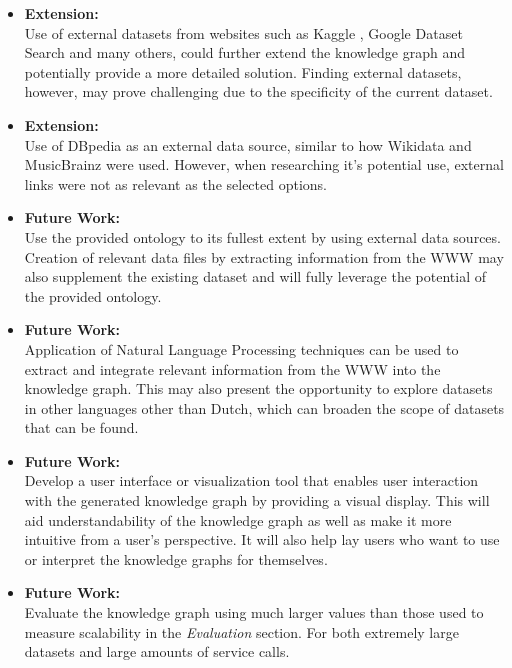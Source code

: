 \begin{itemize}
    \item \textbf{Extension:} \\ Use of external datasets from websites such as Kaggle \cite{kaggle}, Google Dataset Search \cite{googledatasetsearch} and many others, could further extend the knowledge graph and potentially provide a more detailed solution. Finding external datasets, however, may prove challenging due to the specificity of the current dataset.  
    \item \textbf{Extension:} \\ Use of DBpedia \cite{organdbpedia} as an external data source, similar to how Wikidata and MusicBrainz were used. However, when researching it's potential use, external links were not as relevant as the selected options. 
    \item \textbf{Future Work:} \\ Use the provided ontology to its fullest extent by using external data sources. Creation of relevant data files by extracting information from the WWW may also supplement the existing dataset and will fully leverage the potential of the provided ontology. 
    \item \textbf{Future Work:} \\ Application of Natural Language Processing techniques can be used to extract and integrate relevant information from the WWW into the knowledge graph. This may also present the opportunity to explore datasets in other languages other than Dutch, which can broaden the scope of datasets that can be found. 
    \item \textbf{Future Work:} \\ Develop a user interface or visualization tool that enables user interaction with the generated knowledge graph by providing a visual display. This will aid understandability of the knowledge graph as well as make it more intuitive from a user's perspective. It will also help lay users who want to use or interpret the knowledge graphs for themselves. 
    \item \textbf{Future Work:} \\ Evaluate the knowledge graph using much larger values than those used to measure scalability in the \textit{Evaluation} section. For both extremely large datasets and large amounts of service calls. 
\end{itemize}

